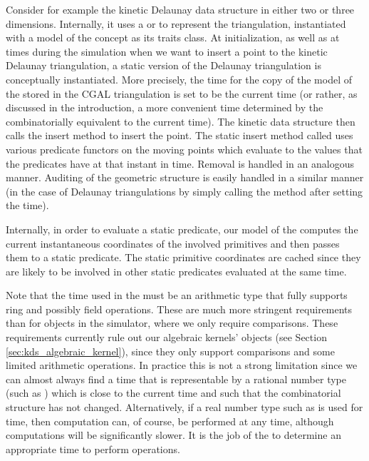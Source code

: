 Consider for example the kinetic Delaunay data structure in either two
or three dimensions.  Internally, it uses a
 or
 to represent the
triangulation, instantiated with a model of the
 concept as its traits class.  At
initialization, as well as at times during the simulation when we want
to insert a point to the kinetic Delaunay triangulation, a static
version of the Delaunay triangulation is conceptually instantiated.
More precisely, the time for the copy of the model of the
 stored in the CGAL triangulation is set
to be the current time (or rather, as discussed in the introduction, a
more convenient time determined by the 
combinatorially equivalent to the current time).  The kinetic data
structure then calls the
 insert
method to insert the point.  The static insert method called uses
various predicate functors on the moving points which evaluate to the
values that the predicates have at that instant in time. Removal is
handled in an analogous manner. Auditing of the geometric structure is
easily handled in a similar manner (in the case of Delaunay
triangulations by simply calling the  method after
setting the time).

Internally, in order to evaluate a static predicate, our model of the
 computes the current instantaneous
coordinates of the involved primitives and then passes them to a
static predicate. The static primitive coordinates are cached since
they are likely to be involved in other static predicates evaluated at
the same time.


Note that the time used in the  must
be an arithmetic type that fully supports ring and possibly field
operations.  These are much more stringent requirements than for
 objects in the simulator, where we only require
comparisons. These requirements currently rule out our algebraic
kernels'  objects (see Section \ref{sec:kds_algebraic_kernel}),
since they only support comparisons and some limited arithmetic
operations. In practice this is not a strong limitation since we can
almost always find a time that is representable by a rational number
type (such as ) which is close to the current time and such
that the combinatorial structure has not changed. Alternatively, if a
real number type such as  is used for time, then
computation can, of course, be performed at any time, although
computations will be significantly slower.  It is the job of the
 to determine an appropriate time to perform
operations.


